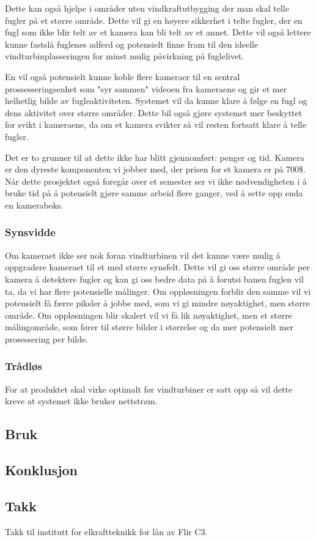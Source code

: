 Dette kan også hjelpe i områder uten vindkraftutbygging der man skal telle fugler på et større område. Dette vil gi en høyere sikkerhet i telte fugler, der en fugl som ikke blir telt av et kamera kan bli telt av et annet. Dette vil også lettere kunne fastslå fuglenes adferd og potensielt finne fram til den ideelle vindturbinplasseringen for minst mulig påvirkning på fuglelivet. 

En vil også potensielt kunne koble flere kameraer til en sentral prossesseringsenhet som "syr sammen" videoen fra kameraene og gir et mer helhetlig bilde av fugleaktiviteten. Systemet vil da kunne klare å følge en fugl og dens aktivitet over større områder. Dette bil også gjøre systemet mer beskyttet for svikt i kameraene, da om et kamera svikter så vil resten fortsatt klare å telle fugler. 

Det er to grunner til at dette ikke har blitt gjennomført: penger og tid. Kamera er den dyreste komponenten vi jobber med, der prisen for et kamera er på 700\$. Når dette prosjektet også foregår over et semester ser vi ikke nødvendigheten i å bruke tid på å potensielt gjøre samme arbeid flere ganger, ved å sette opp enda en kameraboks. 

\subsubsection{Synsvidde}
Om kameraet ikke ser nok foran vindturbinen vil det kunne være mulig å oppgradere kameraet til et med større synsfelt. Dette vil gi oss større område per kamera å detektere fugler og kan gi oss bedre data på å forutsi banen fuglen vil ta, da vi har flere potensielle målinger. Om oppløsningen forblir den samme vil vi potensielt få færre piksler å jobbe med, som vi gi mindre nøyaktighet, men større område. Om oppløsningen blir skalert vil vi få lik nøyaktighet, men et større målingområde, som fører til større bilder i størrelse og da mer potensielt mer prosessering per bilde.

\subsubsection{Trådløs}
For at produktet skal virke optimalt før vindturbiner er satt opp så vil dette kreve at systemet ikke bruker nettstrøm. 

\subsection{Bruk}



\subsection{Konklusjon}

\subsection{Takk}

Takk til institutt for elkraftteknikk for lån av Flir C3.
